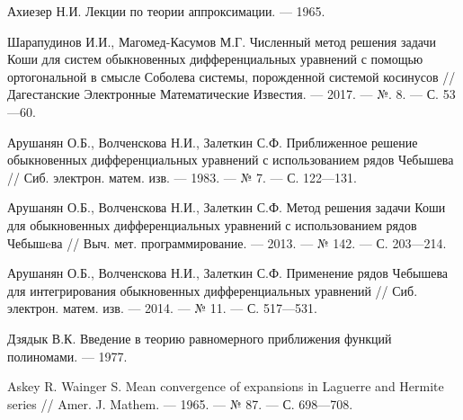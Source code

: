 \begin{thebibliography}{99}
Ахиезер Н.И. Лекции по теории аппроксимации. --- 1965.










Шарапудинов И.И., Магомед-Касумов М.Г. Численный метод решения задачи Коши для систем обыкновенных дифференциальных уравнений с помощью ортогональной в смысле Соболева системы, порожденной системой косинусов // Дагестанские Электронные Математические Известия. --- 2017. --- №. 8. --- С. 53---60.










Арушанян О.Б., Волченскова Н.И., Залеткин С.Ф. Приближенное решение обыкновенных дифференциальных уравнений с использованием рядов Чебышева // Сиб. электрон. матем. изв. --- 1983. --- № 7. --- С. 122---131.










Арушанян О.Б., Волченскова Н.И., Залеткин С.Ф. Метод решения задачи Коши для обыкновенных дифференциальных уравнений с использованием рядов Чебышeва // Выч. мет. программирование. --- 2013. --- № 142. --- С. 203---214.










Арушанян О.Б., Волченскова Н.И., Залеткин С.Ф. Применение рядов Чебышева для интегрирования обыкновенных дифференциальных уравнений // Сиб. электрон. матем. изв. --- 2014. --- № 11. --- С. 517---531.










Дзядык В.К. Введение в теорию равномерного приближения функций полиномами. --- 1977.










Askey R. Wainger S. Mean convergence of expansions in Laguerre and Hermite series // Amer. J. Mathem. --- 1965. --- № 87. --- С. 698---708.


\end{thebibliography}
